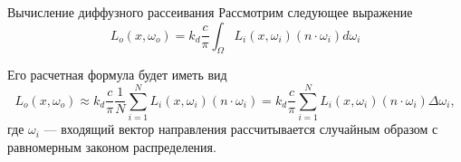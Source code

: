 \documentclass{beamer}
\begin{document}
	\begin{frame}{Вычисление диффузного рассеивания}
		Рассмотрим следующее выражение
		\[
			L_o(x,\omega_o) = k_d \frac{c}{\pi}
			\int_{\Omega}
			L_i(x, \omega_i) (n \cdot \omega_i) d \omega_i
		\]

		Его расчетная формула будет иметь вид
		\[
			L_o(x,\omega_o) 
			\approx 
			k_d \frac{c}{\pi} \frac{1}{N}
			\sum_{i = 1}^{N}
			L_i(x, \omega_i) (n \cdot \omega_i)
			=
			k_d \frac{c}{\pi}
			\sum_{i = 1}^{N}
			L_i(x, \omega_i) (n \cdot \omega_i) \Delta \omega_i
		,
		\]
		где 
		$\omega_i$ --- входящий вектор направления рассчитывается случайным образом с равномерным законом распределения.


	\end{frame}
\end{document}
